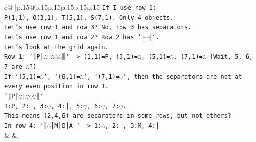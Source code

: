 \documentclass{article}
\begin{document}
{\begin{supertabular}{c@{$\;$}|p{.15\linewidth}@{}p{.15\linewidth}p{.15\linewidth}p{.15\linewidth}p{.15\linewidth}p{.15\linewidth}}
{{{\texttt{If I use row 1:} \\
\texttt{P(1,1), O(3,1), T(5,1), S(7,1). Only 4 objects.} \\
\texttt{Let's use row 1 and row 3? No, row 3 has separators.} \\
\texttt{Let's use row 1 and row 2? Row 2 has `├─┤`.} \\
\texttt{Let's look at the grid again.} \\
\texttt{Row 1: `║P│◌│◌◌◌║` {-}> (1,1)=P, (3,1)=◌, (5,1)=◌, (7,1)=◌ (Wait, 5, 6, 7 are ◌?)} \\
\texttt{If `(5,1)=◌`, `(6,1)=◌`, `(7,1)=◌`, then the separators are not at every even position in row 1.} \\
\texttt{`║P│◌│◌◌◌║`} \\
\texttt{1:P, 2:│, 3:◌, 4:│, 5:◌, 6:◌, 7:◌.} \\
\texttt{This means (2,4,6) are separators in some rows, but not others?} \\
\texttt{In row 4: `║◌│M│O│A║` {-}> 1:◌, 2:│, 3:M, 4:│} \\
            }
        }
    }
    & & \\ \\


\end{supertabular}}
\end{document}

